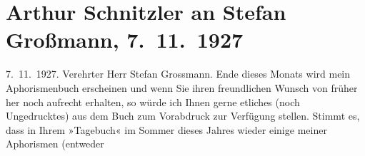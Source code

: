 

         
         \renewcommand{\erwaehntePersonen}{Personen: Stefan Großmann}
         \renewcommand{\erwaehnteInstitutionen}{Institutionen: Das Tage-Buch}
         \renewcommand{\erwaehnteOrte}{Orte: Berlin, Beuthstrasse, Wien}
         \renewcommand{\erwaehnteWerke}{Werke: Bemerkungen, Bemerkungen. (Aus dem noch unveröffentlichten »Buch der Sprüche und Bedenken«), Bemerkungen. Aus dem noch unveröffentlichten »Buch der Sprüche und Bedenken«., Buch der Sprüche und Bedenken, Das Tage-Buch, Dresdner Neueste Nachrichten, Neue Freie Presse}
               \section[Arthur Schnitzler an Stefan Großmann, 7. 11. 1927]{ Arthur Schnitzler an Stefan Großmann, 7. 11. 1927}\nopagebreak{}\rehead{ }\begin{ledgroupsized}[t]{13cm}\normalsize\beginnumbering \toendnotes[C]{\smallbreak\pagebreak[2]} 
\toendnotes[C]{\smallbreak}\pstart
           \raggedleft{}{\pb}7. 11. 1927.\pend
           \pstart{}Verehrter Herr Stefan Grossmann.\pend\pstart
           Ende dieses Monats wird mein Aphorismenbuch erscheinen und wenn Sie ihren
                    freundlichen Wunsch von früher her noch aufrecht erhalten, so würde ich Ihnen
                    gerne etliches (noch Ungedrucktes) aus dem Buch zum Vorabdruck zur
                    Verfügung stellen.\pend
           \pstart
           Stimmt es, dass in Ihrem »Tagebuch« im
                        Sommer dieses Jahres wieder einige meiner Aphorismen (entweder

\end{ledgroupsized}
